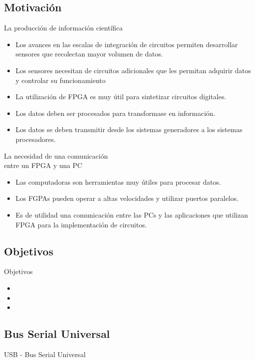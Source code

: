 \documentclass[11pt,a4paper]{beamer}
\begin{document}
		\subsection{Motivación}
			\begin{frame}{La producción de información científica}
				\begin{itemize}
					\item Los avances en las escalas de integración de circuitos permiten desarrollar sensores que recolectan mayor volumen de datos.
					\item Los sensores necesitan de circuitos adicionales que les permitan adquirir datos y controlar su funcionamiento
					\item La utilización de FPGA es muy útil para sintetizar circuitos digitales.
					\item Los datos deben ser procesados para transformase en información.
					\item Los datos se deben transmitir desde los sistemas generadores a los sistemas procesadores.
				\end{itemize}
			\end{frame}
			\begin{frame}{La necesidad de una comunicación\\entre un FPGA y una PC}
				\begin{itemize}
					\item Las computadoras son herramientas muy útiles para procesar datos.
					\item Los FGPAs pueden operar a altas velocidades y utilizar puertos paralelos.
					\item Es de utilidad una comunicación entre las PCs y las aplicaciones que utilizan FPGA para la implementación de circuitos.
				\end{itemize}
			\end{frame}
		\subsection{Objetivos}
			\begin{frame}{Objetivos}
				\begin{itemize}
					\item
					\item
					\item
				\end{itemize}
			\end{frame}
		\subsection{Bus Serial Universal}
			\begin{frame}{USB - Bus Serial Universal}
				
			\end{frame}
\end{document}
